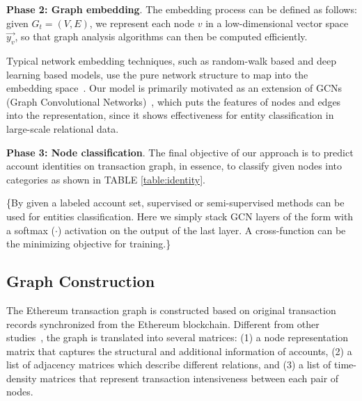 \textbf{Phase 2: Graph embedding}.
The embedding process can be defined as follows: given $G_{t}=(V,E)$, we represent each node $v$ in a low-dimensional vector space $\vec{y_v}$, so that graph analysis algorithms can then be computed efficiently.

Typical network embedding techniques, such as random-walk based and deep learning based models, use the pure network structure to map into the embedding space~\cite{goyal2018capturing}. Our model is primarily motivated as an extension of GCNs (Graph Convolutional Networks)~\cite{kipf2016semi,schlichtkrull2018modeling}, which puts the features of nodes and edges into the representation, since it shows effectiveness for entity classification in large-scale relational data.


\textbf{Phase 3: Node classification}.
The final objective of our approach is to predict account identities on transaction graph, in essence, to classify given nodes into categories as shown in TABLE \ref{table:identity}.

\{By given a labeled account set, supervised or semi-supervised methods can be used for entities classification. Here we simply stack GCN layers of the form with a softmax ($\cdot$) activation on the output of the last layer. A cross-function can be the minimizing objective for training.\}

\subsection{Graph Construction}

The Ethereum transaction graph is constructed based on original transaction records synchronized from the Ethereum blockchain. Different from other studies~\cite{kipf2016semi,schlichtkrull2018modeling}, the graph is translated into several matrices: (1) a node representation matrix that captures the structural and additional information of accounts, (2) a list of adjacency matrices which describe different relations, and (3) a list of time-density matrices that represent transaction intensiveness between each pair of nodes.

